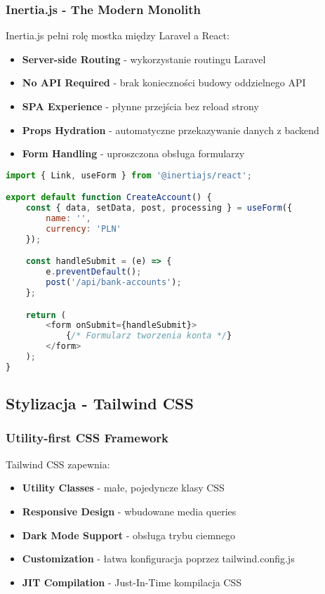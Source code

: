     \subsubsection{Inertia.js - The Modern Monolith}
    Inertia.js pełni rolę mostka między Laravel a React:

    \begin{itemize}
        \item \textbf{Server-side Routing} - wykorzystanie routingu Laravel
        \item \textbf{No API Required} - brak konieczności budowy oddzielnego API
        \item \textbf{SPA Experience} - płynne przejścia bez reload strony
        \item \textbf{Props Hydration} - automatyczne przekazywanie danych z backend
        \item \textbf{Form Handling} - uproszczona obsługa formularzy
    \end{itemize}

    \begin{lstlisting}[language=JavaScript, caption=Przykład komponentu React z Inertia]
import { Link, useForm } from '@inertiajs/react';

export default function CreateAccount() {
    const { data, setData, post, processing } = useForm({
        name: '',
        currency: 'PLN'
    });

    const handleSubmit = (e) => {
        e.preventDefault();
        post('/api/bank-accounts');
    };

    return (
        <form onSubmit={handleSubmit}>
            {/* Formularz tworzenia konta */}
        </form>
    );
}
    \end{lstlisting}

    \subsection{Stylizacja - Tailwind CSS}

    \subsubsection{Utility-first CSS Framework}
    Tailwind CSS zapewnia:

    \begin{itemize}
        \item \textbf{Utility Classes} - małe, pojedyncze klasy CSS
        \item \textbf{Responsive Design} - wbudowane media queries
        \item \textbf{Dark Mode Support} - obsługa trybu ciemnego
        \item \textbf{Customization} - łatwa konfiguracja poprzez tailwind.config.js
        \item \textbf{JIT Compilation} - Just-In-Time kompilacja CSS
    \end{itemize}

